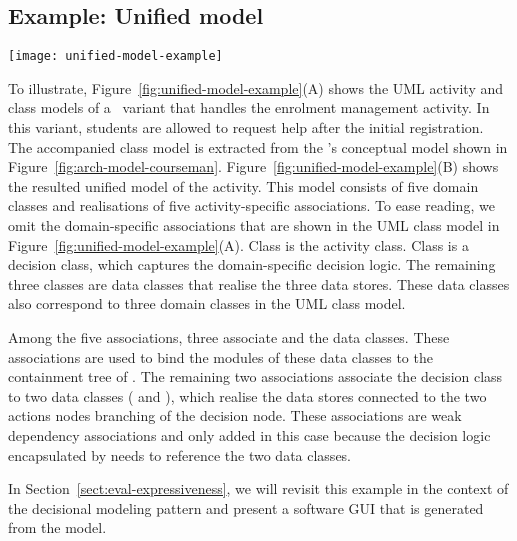 \subsection*{Example: Unified model}
%
\begin{figure*}[ht]
	\begin{center}
		\texttt{[image: unified-model-example]}
	\end{center}
	\caption{(A: Left) The UML activity and class models of a \courseman~software variant that handles the enrolment management activity; (B: Right) The unified model that results.} %
	\label{fig:unified-model-example}
\end{figure*} 

To illustrate, Figure~\ref{fig:unified-model-example}(A) shows the UML activity and class models of a \courseman~variant that handles the enrolment management activity. In this variant, students are allowed to request help after the initial registration. The accompanied class model is extracted from the \courseman's conceptual model shown in Figure~\ref{fig:arch-model-courseman}.
%
Figure~\ref{fig:unified-model-example}(B) shows the resulted unified model of the activity.
This model consists of five domain classes and realisations of five activity-specific associations. To ease reading, we omit the domain-specific associations that are shown in the UML class model in Figure~\ref{fig:unified-model-example}(A). Class  is the activity class. Class  is a decision class, which captures the domain-specific decision logic. The remaining three classes are data classes that realise the three data stores. These data classes also correspond to three domain classes in the UML class model. 

Among the five associations, three associate  and the data classes. These associations are used to bind the modules of these data classes to the containment tree of .
The remaining two associations associate the decision class  to two data classes ( and ), which realise the data stores connected to the two actions nodes branching of the decision node. These associations are weak dependency associations and only added in this case because the decision logic encapsulated by  needs to reference the two data classes.

In Section~\ref{sect:eval-expressiveness}, we will revisit this example in the context of the decisional modeling pattern and present a software GUI that is generated from the model.
